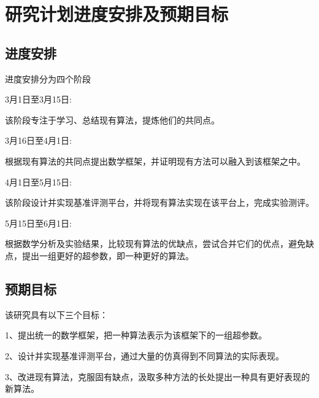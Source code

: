 \section{研究计划进度安排及预期目标}

\subsection{进度安排}

进度安排分为四个阶段

3月1日至3月15日:

该阶段专注于学习、总结现有算法，提炼他们的共同点。

3月16日至4月1日:

根据现有算法的共同点提出数学框架，并证明现有方法可以融入到该框架之中。

4月1日至5月15日:

该阶段设计并实现基准评测平台，并将现有算法实现在该平台上，完成实验测评。

5月15日至6月1日:

根据数学分析及实验结果，比较现有算法的优缺点，尝试合并它们的优点，避免缺点，提出一组更好的超参数，即一种更好的算法。

\subsection{预期目标}

该研究具有以下三个目标：

1、提出统一的数学框架，把一种算法表示为该框架下的一组超参数。

2、设计并实现基准评测平台，通过大量的仿真得到不同算法的实际表现。

3、改进现有算法，克服固有缺点，汲取多种方法的长处提出一种具有更好表现的新算法。